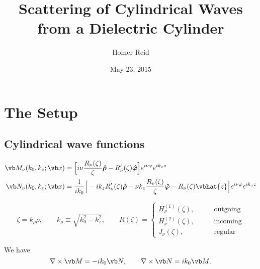 \documentclass[letterpaper]{article}
\title {Scattering of Cylindrical Waves from a Dielectric Cylinder}
\author {Homer Reid}
\date {May 23, 2015}
\newcommand{\vbhatt}[1]{\boldsymbol{\hat #1}}
\begin{document}
\pagestyle{myheadings}
\maketitle

\tableofcontents

\newpage
\section{The Setup}

\subsection{Cylindrical wave functions}

\begin{align*}
 \vb M_{\nu}(k_0, k_z; \vb x) 
   &= \Big[   i\nu\frac{R_\nu(\zeta)}{\zeta}\vbhatt{\rho} 
                  - R_\nu^\prime(\zeta) \vbhatt{\varphi} 
      \Big]e^{i\nu\varphi} e^{ik_z z} 
\\
 \vb N_\nu(k_0, k_z; \vb x) 
&=\frac{1}{ik_0}
      \Big[ -ik_z R_\nu^\prime(\zeta)          \vbhatt{\rho}
            +\nu k_z \frac{R_\nu(\zeta)}{\zeta} \vbhatt{\varphi}
            - R_\nu(\zeta)\vbhat{z}
      \Big] e^{i\nu\varphi} e^{ik_z z} 
\end{align*}

$$ 
 \zeta=k_\rho \rho, 
 \qquad
 k_\rho\equiv \sqrt{k_0^2 - k_z^2},
 \qquad
 R(\zeta) =
 \begin{cases}
   H^{(1)}_\nu(\zeta), \qquad &\text{outgoing} \\
   H^{(2)}_\nu(\zeta), \qquad &\text{incoming} \\
   J_\nu      (\zeta), \qquad &\text{regular}
 \end{cases}
$$

We have 
$$ \nabla \times \vb M = -ik_0 \vb N, 
   \qquad 
   \nabla \times \vb N = ik_0 \vb M.
$$
\end{document}
